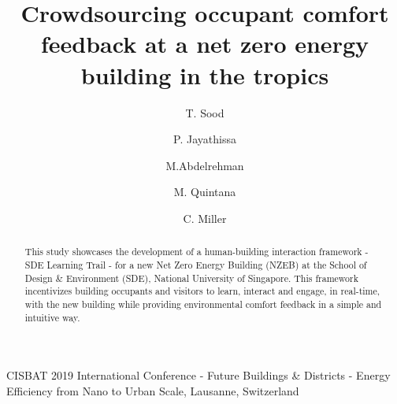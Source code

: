 \documentclass[preprint,11pt,3p]{elsarticle} %
\begin{document}
\begin{frontmatter}


\begin{center}
{CISBAT 2019 International Conference - Future Buildings \& Districts - Energy Efficiency from Nano to Urban Scale, Lausanne, Switzerland}
\end{center}

\title{Crowdsourcing occupant comfort feedback at a net zero energy building in the tropics} 

\address[buds]{Building and Urban Data Science Group,  Department of Building, Singapore} 

\author[buds]{T. Sood}


\author[buds]{P. Jayathissa}

\author[buds]{M.Abdelrehman}

\author[buds]{M. Quintana}




\author[buds]{C. Miller }





\begin{abstract}

This study showcases the development of a human-building interaction framework - SDE Learning Trail - for a new Net Zero Energy Building (NZEB) at the School of Design \& Environment (SDE), National University of Singapore. This framework incentivizes building occupants and visitors to learn, interact and engage, in real-time, with the new building while providing environmental comfort feedback in a simple and intuitive way. 
 

\end{abstract}
\end{frontmatter}
\end{document}
